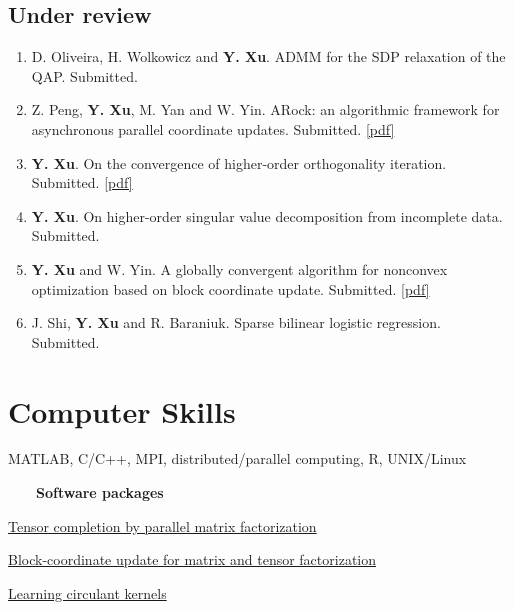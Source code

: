 \documentclass[letterpaper]{article}
\renewenvironment{itemize}{
  \begin{list}{}{
    \setlength{\leftmargin}{1.5em}
  }
}{
  \end{list}
}
\begin{document}
\subsection*{Under review}
\begin{enumerate}\setlength{\itemsep}{-1.5pt}
\item D. Oliveira, H. Wolkowicz and \textbf{Y. Xu}. ADMM for the SDP relaxation of the QAP. Submitted.
\item Z. Peng, \textbf{Y. Xu}, M. Yan and W. Yin. ARock: an algorithmic framework for asynchronous parallel coordinate updates. Submitted. \href{http://xxx.tau.ac.il/pdf/1506.02396v1.pdf}{[pdf]}
\item \textbf{Y. Xu}. On the convergence of higher-order orthogonality iteration. Submitted. \href{http://arxiv.org/pdf/1504.00538v1}{[pdf]}
\item \textbf{Y. Xu}. On higher-order singular value decomposition from incomplete data. Submitted.
\item \textbf{Y. Xu} and W. Yin. A globally convergent algorithm for nonconvex optimization based on block coordinate update. Submitted.
\href{ftp://ftp.math.ucla.edu/pub/camreport/cam13-38.pdf}{[pdf]}
\item J. Shi, \textbf{Y. Xu} and R. Baraniuk. Sparse bilinear logistic regression. Submitted.
\end{enumerate}

\section*{Computer Skills}
\begin{itemize}
\item MATLAB, C/C++, MPI, distributed/parallel computing, R, UNIX/Linux
\end{itemize}
~~~~\textbf{Software packages}
\begin{itemize}\setlength{\itemsep}{-1pt}
\item \href{http://www.math.ucla.edu/~wotaoyin/papers/tmac.html}{Tensor completion by parallel matrix factorization}
\item \href{http://www.math.ucla.edu/~wotaoyin/papers/bcu/}{Block-coordinate update for matrix and tensor factorization}
\item \href{http://www.caam.rice.edu/~optimization/circulant/}{Learning circulant kernels}
\end{itemize}
\end{document}

